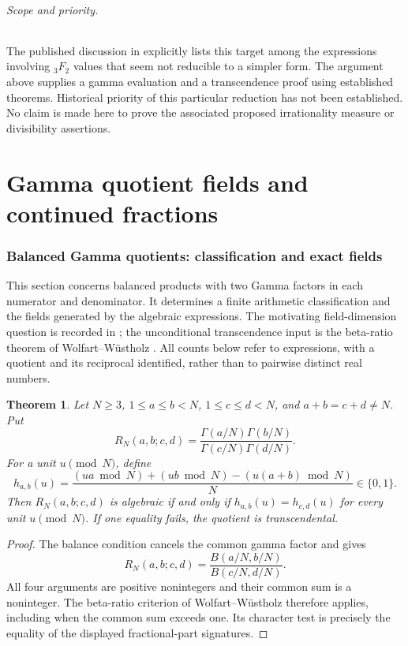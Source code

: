 \documentclass[11pt,a4paper]{article}
\newtheorem{theorem}{Theorem}[section]
\theoremstyle{definition}
\theoremstyle{remark}
\numberwithin{equation}{section}
\begin{document}
\paragraph{Scope and priority.}
The published discussion in \cite{extra8-zudilin} explicitly lists this
target among the expressions involving ${}_3F_2$ values that seem
not reducible to a simpler form. The argument above supplies a gamma
evaluation and a transcendence proof using established theorems.
Historical priority of this particular reduction has not been
established. No claim is made here to prove the associated proposed
irrationality measure or divisibility assertions.



\clearpage

\part{Gamma quotient fields and continued fractions}
\section{Balanced Gamma quotients: classification and exact fields}
\label{fields-sec-gammafields}
This section concerns balanced products with two Gamma factors in each
numerator and denominator. It determines a finite arithmetic
classification and the fields generated by the algebraic expressions.
The motivating field-dimension question is recorded in
\cite{fields-MSE}; the unconditional transcendence input is the
beta-ratio theorem of Wolfart--W\"ustholz \cite{dbkz-ww}.
All counts below refer to expressions, with a quotient and its reciprocal
identified, rather than to pairwise distinct real numbers.


\begin{theorem}
Let $N\geq3$, $1\leq a\leq b<N$, $1\leq c\leq d<N$, and
$a+b=c+d\ne N$.  Put
\[
 R_N(a,b;c,d)=\frac{\Gamma(a/N)\Gamma(b/N)}
 {\Gamma(c/N)\Gamma(d/N)}.
\]
For a unit $u\pmod N$, define
\[
 h_{a,b}(u)=\frac{(ua\bmod N)+(ub\bmod N)
 -(u(a+b)\bmod N)}{N}\in\{0,1\}.
\]
Then $R_N(a,b;c,d)$ is algebraic if and only if
$h_{a,b}(u)=h_{c,d}(u)$ for every unit $u\pmod N$.
If one equality fails, the quotient is transcendental.
\end{theorem}

\begin{proof}
The balance condition cancels the common gamma factor and gives
\[
 R_N(a,b;c,d)=\frac{B(a/N,b/N)}{B(c/N,d/N)}.
\]
All four arguments are positive nonintegers and their common sum is a
noninteger.  The beta-ratio criterion of Wolfart--W\"ustholz therefore
applies, including when the common sum exceeds one.  Its character test is
precisely the equality of the displayed fractional-part signatures.
\end{proof}
\end{document}
